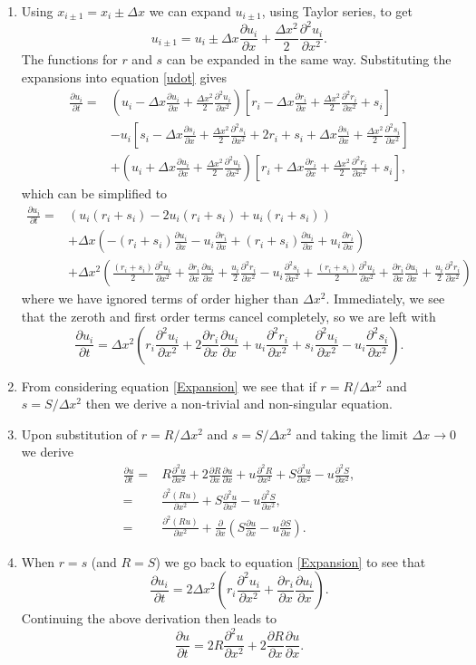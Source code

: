 \documentclass[10pt]{article}
\newcommand{\bb}{\begin{equation}}
\newcommand{\ee}{\end{equation}}
\newcommand{\D}[2]{\frac{\partial #1}{\partial #2}}
\newcommand{\DD}[2]{\frac{\partial^2 #1}{\partial #2^2}}
\newcommand{\eqn}[1]{equation \eqref{#1}}
\renewcommand{\l}{\left(}
\renewcommand{\r}{\right)}
\begin{document}
\begin{Answ}
\begin{enumerate}
\item Using $x_{i\pm 1}=x_i\pm\Delta x$ we can expand $u_{i\pm 1}$, using Taylor series, to get
\bb
u_{i\pm 1}=u_i\pm \Delta x\D{u_i}{x}+\frac{\Delta x^2}{2}\DD{u_i}{x}.
\ee
The functions for $r$ and $s$ can be expanded in the  same way. Substituting the expansions into \eqn{udot} gives
\begin{align}
\D{u_i}{t}=&\l u_i- \Delta x\D{u_i}{x}+\frac{\Delta x^2}{2}\DD{u_i}{x}\r\left[ r_i- \Delta x\D{r_i}{x}+\frac{\Delta x^2}{2}\DD{r_i}{x}+s_i\right]\nonumber\\
&-u_i\left[s_i- \Delta x\D{s_i}{x}+\frac{\Delta x^2}{2}\DD{s_i}{x}+2r_i+s_i+ \Delta x\D{s_i}{x}+\frac{\Delta x^2}{2}\DD{s_i}{x}\right]\nonumber\\
&+\l u_i +\Delta x\D{u_i}{x}+\frac{\Delta x^2}{2}\DD{u_i}{x}\r\left[ r_i+ \Delta x\D{r_i}{x}+\frac{\Delta x^2}{2}\DD{r_i}{x}+s_i\right],
\end{align}
which can be simplified to
\begin{align}
\D{u_i}{t}=&\l u_i(r_i+s_i)-2u_i(r_i+s_i)+u_i(r_i+s_i)\r\nonumber\\
&+\Delta x \l -(r_i+s_i)\D{u_i}{x}-u_i\D{r_i}{x}+(r_i+s_i)\D{u_i}{x}+u_i\D{r_i}{x}\r\nonumber\\
&+\Delta x^2 \l \frac{(r_i+s_i)}{2}\DD{u_i}{x}+\D{r_i}{x}\D{u_i}{x}+\frac{u_i}{2}\DD{r_i}{x}-u_i\DD{s_i}{x}+\frac{(r_i+s_i)}{2}\DD{u_i}{x}+\D{r_i}{x}\D{u_i}{x}+\frac{u_i}{2}\DD{r_i}{x}\r
\end{align}
where we have ignored terms of order higher than $\Delta x^2$. Immediately, we see that the zeroth and first order terms cancel completely, so we are left with
\bb
\D{u_i}{t}=\Delta x^2 \l r_i\DD{u_i}{x}+2\D{r_i}{x}\D{u_i}{x}+u_i\DD{r_i}{x}+s_i\DD{u_i}{x}-u_i\DD{s_i}{x}\r.\label{Expansion}
\ee


\item From considering \eqn{Expansion} we see that if $r= R/\Delta x^2$ and $s=S/\Delta x^2$ then we derive a non-trivial and non-singular equation.


\item Upon substitution of $r=R/\Delta x^2$ and $s=S/\Delta x^2$ and taking the limit $\Delta x\rightarrow 0$ we derive
\begin{align}
\D{u}{t}=& R\DD{u}{x}+2\D{R}{x}\D{u}{x}+u\DD{R}{x}+S\DD{u}{x}-u\DD{S}{x},\nonumber\\
=&\DD{\l Ru\r}{x}+S\DD{u}{x}-u\DD{S}{x},\nonumber\\
=&\DD{\l Ru\r }{x}+\D{}{x}\l S\D{u}{x}-u\D{S}{x}\r.
\end{align}

\item When $r=s$ (and $R=S$) we go back to \eqn{Expansion} to see that
\bb
\D{u_i}{t}=2\Delta x^2 \l r_i\DD{u_i}{x}+\D{r_i}{x}\D{u_i}{x}\r.
\ee
Continuing the above derivation then leads to
\bb
\D{u}{t}=2R\DD{u}{x}+2\D{R}{x}\D{u}{x}.
\ee
\end{enumerate}
\end{Answ}
\end{document}
